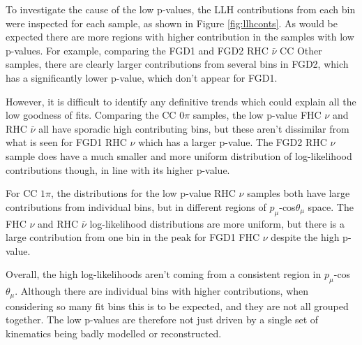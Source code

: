 To investigate the cause of the low p-values, the LLH contributions from each bin were inspected for each sample, as shown in Figure \ref{fig:llhconts}. As would be expected there are more regions with higher contribution in the samples with low p-values. For example, comparing the FGD1 and FGD2 RHC $\bar{\nu}$ CC Other samples, there are clearly larger contributions from several bins in FGD2, which has a significantly lower p-value, which don't appear for FGD1.

However, it is difficult to identify any definitive trends which could explain all the low goodness of fits. Comparing the CC 0$\pi$ samples, the low p-value FHC $\nu$ and RHC $\bar{\nu}$ all have sporadic high contributing bins, but these aren't dissimilar from what is seen for FGD1 RHC $\nu$ which has a larger p-value. The FGD2 RHC $\nu$ sample does have a much smaller and more uniform distribution of log-likelihood contributions though, in line with its higher p-value.

For CC $1\pi$, the distributions for the low p-value RHC $\nu$ samples both have large contributions from individual bins, but in different regions of $p_{\mu}$-cos$\theta_{\mu}$ space. The FHC $\nu$ and RHC $\bar{\nu}$ log-likelihood distributions are more uniform, but there is a large contribution from one bin in the peak for FGD1 FHC $\nu$ despite the high p-value.

Overall, the high log-likelihoods aren't coming from a consistent region in $p_{\mu}$-cos$\theta_{\mu}$. Although there are individual bins with higher contributions, when considering so many fit bins this is to be expected, and they are not all grouped together.  The low p-values are therefore not just driven by a single set of kinematics being badly modelled or reconstructed. 

